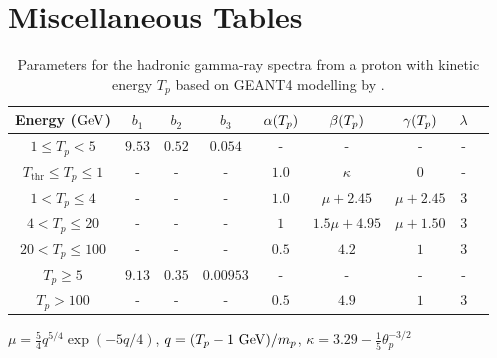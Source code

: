 \chapter{Miscellaneous Tables} \label{A6_misc}

\begin{table}[h!]
    \centering
    \begin{threeparttable}
   \begin{tabular}{ccccccccc}
        \hline
        Energy ($\si{\giga\electronvolt}$)  & $b_1$ & $b_2$ & $b_3$ & $\alpha\qty(T_p)$ & $\beta\qty(T_p)$ & $\gamma\qty(T_p)$ & $\lambda$ \\
        \hline 
         $1\leq T_p < 5$ & $9.53$ & $0.52$ & $0.054$ & - & - & - & - \\
         $T_\text{thr} \leq T_p \leq 1$ & - & - & - & $1.0$ & $\kappa$ & 0 & - \\
         $1 < T_p \leq 4$ & - & - & - & $1.0$ & $\mu+2.45$ & $\mu+2.45$ & $3$ \\
         $4 < T_p \leq 20$ & - & - & - & $1$ & $1.5\mu+4.95$ & $\mu+1.50$ & $3$ \\
         $20 < T_p \leq 100$ & - & - & - & $0.5$ & $4.2$ & $1$ & $3$ \\
         $T_p \geq 5$ & $9.13$ & $0.35$ & $0.00953$ & - & - & - & - \\
         $T_p > 100$ & - & - & - & $0.5$ & $4.9$ & $1$ & $3$ \\
         \hline
    \end{tabular}
    \begin{tablenotes}
    \item $\mu=\frac{5}{4}q^{5/4}\exp(-5q/4)$, $q=\qty(T_p-1~\si{\giga\electronvolt})/m_p$, $\kappa=3.29-\frac{1}{5}\theta_p^{-3/2}$
    \end{tablenotes}
    \caption{Parameters for the hadronic gamma-ray spectra from a proton with kinetic energy $T_p$ based on GEANT4 modelling by \cite{2014PhRvD..90l3014K}.}
    \label{tab:chapter1_Kafexhio}
    \end{threeparttable}
\end{table}